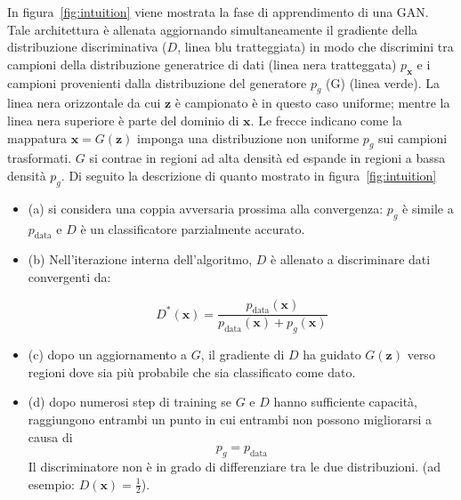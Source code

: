 In figura~\ref{fig:intuition} viene mostrata la fase di apprendimento di una GAN. Tale architettura è allenata aggiornando simultaneamente il gradiente della distribuzione discriminativa ($D$, linea blu tratteggiata) in modo che discrimini tra campioni della distribuzione generatrice di dati (linea nera tratteggata) $p_{\bm{x}}$ e i campioni provenienti dalla distribuzione del generatore $p_g$ (G) (linea verde).
La linea nera orizzontale da cui $\bm{z}$ è campionato è in questo caso uniforme; mentre la linea nera superiore è parte del dominio di $\bm{x}$. Le frecce indicano come la mappatura $\bm{x}=G(\bm{z})$ imponga una distribuzione non uniforme $p_g$ sui campioni trasformati. $G$ si contrae in regioni ad alta densità ed espande in regioni a bassa densità $p_g$. 
Di seguito la descrizione di quanto mostrato in figura~\ref{fig:intuition}
\begin{itemize}
\item (a) si considera una coppia avversaria prossima alla convergenza: $p_g$ è simile a $p_\text{data}$ e
$D$ è un classificatore parzialmente accurato.

\item (b) Nell'iterazione interna dell'algoritmo, $D$ è allenato a discriminare dati convergenti da:

\[D^*(\bm{x}) = 
\frac{
    p_\text{data}(\bm{x})
    }{
        p_\text{data}(\bm{x}) + p_g(\bm{x})}
\]

\item (c) dopo un aggiornamento a $G$, il gradiente di $D$ ha guidato $G(\bm{z})$ verso regioni dove sia più probabile che sia classificato come dato.

\item (d) dopo numerosi step di training se $G$ e $D$ hanno sufficiente capacità, raggiungono entrambi un punto in cui entrambi non possono migliorarsi a causa di \[p_g = p_\text{data}\] Il discriminatore non è in grado di differenziare tra le due distribuzioni. (ad esempio: $D(\bm{x}) = \frac{1}{2}$).
\end{itemize}

